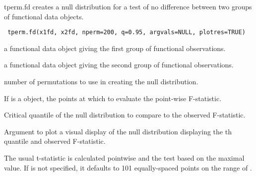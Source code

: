 \documentclass{article}
\begin{document}
\begin{Description}\relax
tperm.fd creates a null distribution for a test of no difference between two
groups of functional data objects.
\end{Description}
\begin{Usage}
\begin{verbatim}
 tperm.fd(x1fd, x2fd, nperm=200, q=0.95, argvals=NULL, plotres=TRUE)
\end{verbatim}
\end{Usage}
\begin{Arguments}
\begin{ldescription}
\item[\code{x1fd}] a functional data object giving the first group of functional observations.

\item[\code{x2fd}] a functional data object giving the second group of functional
observations.

\item[\code{nperm}] number of permutations to use in creating the null distribution.

\item[\code{argvals}] If  is a  object, the points at which to evaluate
the point-wise F-statistic.

\item[\code{q}] Critical quantile of the null distribution to compare to the observed
F-statistic.

\item[\code{plotres}] Argument to plot a visual display of the null distribution displaying the
th quantile and observed F-statistic.

\end{ldescription}
\end{Arguments}
\begin{Details}\relax
The usual t-statistic is calculated pointwise and the test based on the
maximal value. If  is not specified,
it defaults to 101 equally-spaced points on the range of .
\end{Details}
\end{document}
